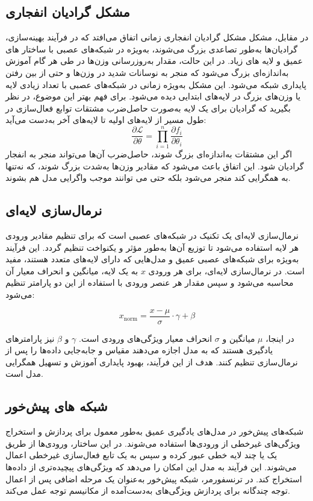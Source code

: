 \subsection{مشکل گرادیان انفجاری}
در مقابل، مشکل مشکل گرادیان انفجاری%
زمانی اتفاق می‌افتد که در فرآیند بهینه‌سازی، گرادیان‌ها به‌طور تصاعدی بزرگ می‌شوند، به‌ویژه در شبکه‌های عصبی با ساختار های عمیق و لایه های زیاد. در این حالت، مقدار به‌روزرسانی وزن‌ها در طی هر گام آموزش به‌اندازه‌ای بزرگ می‌شود که منجر به نوسانات شدید در وزن‌ها و حتی از بین رفتن پایداری شبکه می‌شود. این مشکل به‌ویژه زمانی در شبکه‌های عصبی با تعداد زیادی لایه یا وزن‌های بزرگ در لایه‌های ابتدایی دیده می‌شود. برای فهم بهتر این موضوع، در نظر بگیرید که گرادیان برای یک لایه به‌صورت حاصل‌ضرب مشتقات توابع فعال‌سازی در طول مسیر از لایه‌های اولیه تا لایه‌های آخر به‌دست می‌آید:
$$
\frac{\partial \mathcal{L}}{\partial \theta} = \prod_{i=1}^{n} \frac{\partial f_i}{\partial \theta_i}
$$
اگر این مشتقات به‌اندازه‌ای بزرگ شوند، حاصل‌ضرب آن‌ها می‌تواند منجر به انفجار گرادیان شود. این اتفاق باعث می‌شود که مقادیر وزن‌ها به‌شدت بزرگ شوند، که نه‌تنها به همگرایی کند منجر می‌شود بلکه حتی می توانند موجب واگرایی مدل هم بشوند.


\subsection{نرمال‌سازی لایه‌ای}

نرمال‌سازی لایه‌ای%
یک تکنیک در شبکه‌های عصبی است که برای تنظیم مقادیر ورودی هر لایه استفاده می‌شود تا توزیع آن‌ها به‌طور مؤثر و یکنواخت تنظیم گردد. این فرآیند به‌ویژه برای شبکه‌های عصبی عمیق و مدل‌هایی که دارای لایه‌های متعدد هستند، مفید است. در نرمال‌سازی لایه‌ای، برای هر ورودی $x$ به یک لایه، میانگین و انحراف معیار آن محاسبه می‌شود و سپس مقدار هر عنصر ورودی با استفاده از این دو پارامتر تنظیم می‌شود:

\[
x_{\text{norm}} = \frac{x - \mu}{\sigma} \cdot \gamma + \beta
\]

در اینجا، $\mu$ میانگین و $\sigma$ انحراف معیار ویژگی‌های ورودی است. $\gamma$ و $\beta$ نیز پارامترهای یادگیری هستند که به مدل اجازه می‌دهند مقیاس و جابه‌جایی داده‌ها را پس از نرمال‌سازی تنظیم کنند. هدف از این فرآیند، بهبود پایداری آموزش و تسهیل همگرایی مدل است.

\subsection{شبکه های پیش‌خور}

شبکه‌های پیش‌خور%
در مدل‌های یادگیری عمیق به‌طور معمول برای پردازش و استخراج ویژگی‌های غیرخطی از ورودی‌ها استفاده می‌شوند. در این ساختار، ورودی‌ها از طریق یک یا چند لایه خطی عبور کرده و سپس به یک تابع فعال‌سازی غیرخطی اعمال می‌شوند. این فرآیند به مدل این امکان را می‌دهد که ویژگی‌های پیچیده‌تری از داده‌ها استخراج کند. در ترنسفورمر، شبکه پیش‌خور به‌عنوان یک مرحله اضافی پس از اعمال توجه چندگانه برای پردازش ویژگی‌های به‌دست‌آمده از مکانیسم توجه عمل می‌کند.

